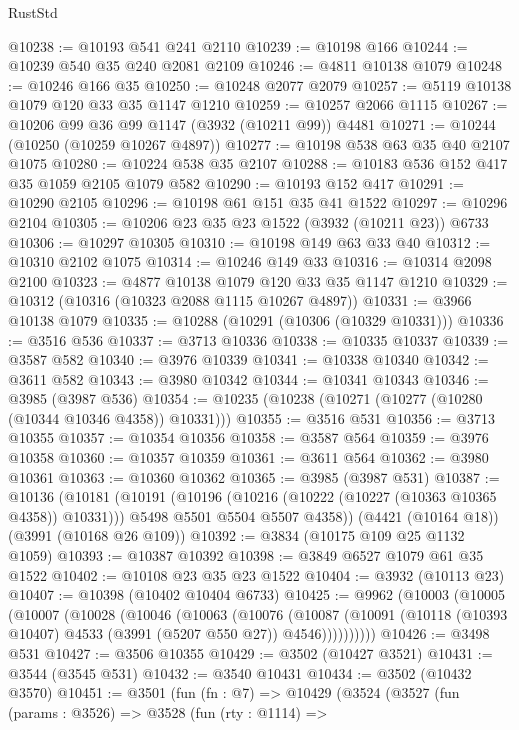 \begin{lexlean}{RustStd}
\begin{coremodule}
@10238 := @10193 @541 @241 @2110
@10239 := @10198 @166
@10244 := @10239 @540 @35 @240 @2081 @2109
@10246 := @4811 @10138 @1079
@10248 := @10246 @166 @35
@10250 := @10248 @2077 @2079
@10257 := @5119 @10138 @1079 @120 @33 @35 @1147 @1210
@10259 := @10257 @2066 @1115
@10267 := @10206 @99 @36 @99 @1147 (@3932 (@10211 @99)) @4481
@10271 := @10244 (@10250 (@10259 @10267 @4897))
@10277 := @10198 @538 @63 @35 @40 @2107 @1075
@10280 := @10224 @538 @35 @2107
@10288 := @10183 @536 @152 @417 @35 @1059 @2105 @1079 @582
@10290 := @10193 @152 @417
@10291 := @10290 @2105
@10296 := @10198 @61 @151 @35 @41 @1522
@10297 := @10296 @2104
@10305 := @10206 @23 @35 @23 @1522 (@3932 (@10211 @23)) @6733
@10306 := @10297 @10305
@10310 := @10198 @149 @63 @33 @40
@10312 := @10310 @2102 @1075
@10314 := @10246 @149 @33
@10316 := @10314 @2098 @2100
@10323 := @4877 @10138 @1079 @120 @33 @35 @1147 @1210
@10329 := @10312 (@10316 (@10323 @2088 @1115 @10267 @4897))
@10331 := @3966 @10138 @1079
@10335 := @10288 (@10291 (@10306 (@10329 @10331)))
@10336 := @3516 @536
@10337 := @3713 @10336
@10338 := @10335 @10337
@10339 := @3587 @582
@10340 := @3976 @10339
@10341 := @10338 @10340
@10342 := @3611 @582
@10343 := @3980 @10342
@10344 := @10341 @10343
@10346 := @3985 (@3987 @536)
@10354 := @10235 (@10238 (@10271 (@10277 (@10280 (@10344 @10346 @4358)) @10331)))
@10355 := @3516 @531
@10356 := @3713 @10355
@10357 := @10354 @10356
@10358 := @3587 @564
@10359 := @3976 @10358
@10360 := @10357 @10359
@10361 := @3611 @564
@10362 := @3980 @10361
@10363 := @10360 @10362
@10365 := @3985 (@3987 @531)
@10387 := @10136
    (@10181
      (@10191
        (@10196 (@10216 (@10222 (@10227 (@10363 @10365 @4358)) @10331)))
        @5498
        @5501
        @5504
        @5507
        @4358))
    (@4421 (@10164 @18))
    (@3991 (@10168 @26 @109))
@10392 := @3834 (@10175 @109 @25 @1132 @1059)
@10393 := @10387 @10392
@10398 := @3849 @6527 @1079 @61 @35 @1522
@10402 := @10108 @23 @35 @23 @1522
@10404 := @3932 (@10113 @23)
@10407 := @10398 (@10402 @10404 @6733)
@10425 := @9962
    (@10003
      (@10005
        (@10007
          (@10028
            (@10046
              (@10063
                (@10076
                  (@10087
                    (@10091 (@10118 (@10393 @10407) @4533 (@3991 (@5207 @550 @27)) @4546))))))))))
@10426 := @3498 @531
@10427 := @3506 @10355
@10429 := @3502 (@10427 @3521)
@10431 := @3544 (@3545 @531)
@10432 := @3540 @10431
@10434 := @3502 (@10432 @3570)
@10451 := @3501
    (fun (fn : @7) =>
    @10429
      (@3524
        (@3527
          (fun (params : @3526) =>
          @3528
            (fun (rty : @1114) =>

\end{coremodule}
\end{lexlean}
